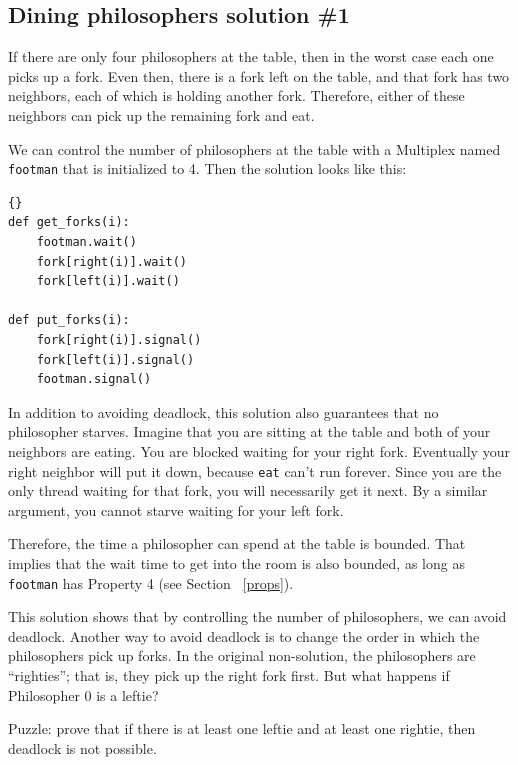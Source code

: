 \documentclass{book}
\newcommand{\clearemptydoublepage}{\newpage\cleardoublepage}
\begin{document}
\clearemptydoublepage
\subsection{Dining philosophers solution \#1}

If there are only four philosophers at the table, then in the
worst case each one picks up a fork.  Even then, there is a fork
left on the table, and that fork has two neighbors, each of
which is holding another fork.  Therefore, either of these
neighbors can pick up the remaining fork and eat.

We can control the number of philosophers at the table with
a Multiplex named {\tt footman} that is initialized to 4.
Then the solution looks like this:

\begin{latin}
\begin{latin}
\begin{lstlisting}[title={Dining philosophers solution \#1}]{}
def get_forks(i):
    footman.wait()
    fork[right(i)].wait()
    fork[left(i)].wait()

def put_forks(i):
    fork[right(i)].signal()
    fork[left(i)].signal()
    footman.signal()
\end{lstlisting}
\end{latin}
\end{latin}

In addition to avoiding deadlock, this solution also guarantees that
no philosopher starves.
Imagine that you
are sitting at the table and both of your neighbors are eating.  You
are blocked waiting for your right fork.  Eventually your right
neighbor will put it down, because {\tt eat} can't run forever.  Since
you are the only thread waiting for that fork, you will necessarily
get it next.  By a similar argument, you cannot starve waiting for
your left fork.

Therefore, the time a philosopher can spend at the table is bounded.
That implies that the wait time to get into the room is also bounded,
as long as {\tt footman} has Property 4 (see Section ~\ref{props}).

This solution shows that
by controlling the number of philosophers, we can avoid deadlock.
Another way to avoid deadlock is to change the order in which the
philosophers pick up forks.  In the original non-solution, the
philosophers are ``righties''; that is, they pick up the right fork
first.  But what happens if Philosopher 0 is a leftie?

Puzzle: prove that if there is at least one leftie and at least one
rightie, then deadlock is not possible.
\end{document}
